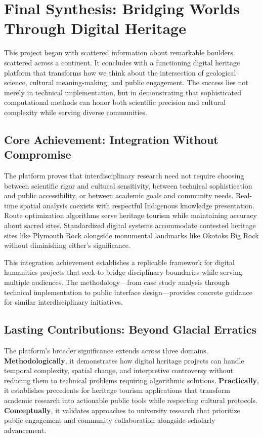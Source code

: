 \section{Final Synthesis: Bridging Worlds Through Digital Heritage}
\label{sec:final_synthesis}

This project began with scattered information about remarkable boulders scattered across a continent. It concludes with a functioning digital heritage platform that transforms how we think about the intersection of geological science, cultural meaning-making, and public engagement. The success lies not merely in technical implementation, but in demonstrating that sophisticated computational methods can honor both scientific precision and cultural complexity while serving diverse communities.

\subsection{Core Achievement: Integration Without Compromise}
\label{subsec:core_achievement}

The platform proves that interdisciplinary research need not require choosing between scientific rigor and cultural sensitivity, between technical sophistication and public accessibility, or between academic goals and community needs. Real-time spatial analysis coexists with respectful Indigenous knowledge presentation. Route optimization algorithms serve heritage tourism while maintaining accuracy about sacred sites. Standardized digital systems accommodate contested heritage sites like Plymouth Rock alongside monumental landmarks like Okotoks Big Rock without diminishing either's significance.

This integration achievement establishes a replicable framework for digital humanities projects that seek to bridge disciplinary boundaries while serving multiple audiences. The methodology—from case study analysis through technical implementation to public interface design—provides concrete guidance for similar interdisciplinary initiatives.

\subsection{Lasting Contributions: Beyond Glacial Erratics}
\label{subsec:lasting_contributions}

The platform's broader significance extends across three domains. \textbf{Methodologically}, it demonstrates how digital heritage projects can handle temporal complexity, spatial change, and interpretive controversy without reducing them to technical problems requiring algorithmic solutions. \textbf{Practically}, it establishes precedents for heritage tourism applications that transform academic research into actionable public tools while respecting cultural protocols. \textbf{Conceptually}, it validates approaches to university research that prioritize public engagement and community collaboration alongside scholarly advancement.

